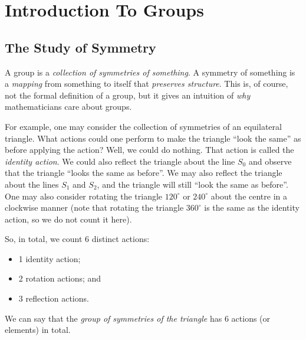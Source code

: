 \chapter{Introduction To Groups}
\section{The Study of Symmetry}
A group is a \textit{collection of symmetries of something}. A symmetry of something is a \textit{mapping} from something to itself that \textit{preserves structure}. This is, of course, not the formal definition of a group, but it gives an intuition of \textit{why} mathematicians care about groups.

\begin{figure}
    \centering
\end{figure}

For example, one may consider the collection of symmetries of an equilateral triangle. What actions could one perform to make the triangle ``look the same'' as before applying the action? Well, we could do nothing. That action is called the \textit{identity action}. We could also reflect the triangle about the line $S_0$ and observe that the triangle ``looks the same as before''. We may also reflect the triangle about the lines $S_1$ and $S_2$, and the triangle will still ``look the same as before''. One may also consider rotating the triangle $120^\circ$ or $240^\circ$ about the centre in a clockwise manner (note that rotating the triangle $360^\circ$ is the same as the identity action, so we do not count it here).

\newpage

So, in total, we count 6 distinct actions:
\begin{itemize}
    \item 1 identity action;
    \item 2 rotation actions; and
    \item 3 reflection actions.
\end{itemize}
We can say that the \textit{group of symmetries of the triangle} has 6 actions (or elements) in total.

